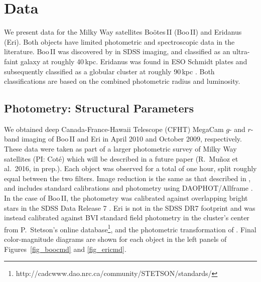 \documentclass{../tex_files/emulateapj}
\begin{document}


\section{Data}\label{sec_data}

We present data for the Milky Way satellites Bo\"otes\,II (Boo\,II)
and Eridanus (Eri).  Both objects have limited photometric and
spectroscopic data in the literature.  Boo\,II was discovered by
\citet{2007ApJ...662L..83W} in SDSS imaging, and classified as an
ultra-faint galaxy at roughly 40\,kpc.  Eridanus was found in ESO
Schmidt plates and subsequently classified as a globular cluster at
roughly 90\,kpc \citep{cesarsky77}.  Both classifications are based on
the combined photometric radius and luminosity.


\subsection{Photometry: Structural Parameters}\label{ssec_struct}

We obtained deep Canada-France-Hawaii Telescope (CFHT) MegaCam $g$-
and $r$-band imaging of Boo\,II and Eri in April 2010 and October
2009, respectively.  These data were taken as part of a larger
photometric survey of Milky Way satellites (PI: Cot\'e) which will be
described in a future paper (R.~Mu\~noz et al.~2016, in prep.).  Each
object was observed for a total of one hour, split roughly equal
between the two filters.  Image reduction is the same as that
described in \citet{munoz10a}, and includes standard calibrations and
photometry using DAOPHOT/Allframe \citep{stetson94a}.  In the case of
Boo\,II, the photometry was calibrated against overlapping bright
stars in the SDSS Data Release 7 \citep[][DR7]{2009ApJS..182..543A}.  Eri is not in
the SDSS DR7 footprint and was instead calibrated against BVI standard
field photometry in the cluster's center from P.~Stetson's online
database\footnote{http://cadcwww.dao.nrc.ca/community/STETSON/standards/},
and the photometric transformation of \citet{2007AJ....133..734B}.  Final
color-magnitude diagrams are shown for each object in the left panels
of Figures~\ref{fig_boocmd} and \ref{fig_ericmd}.
\end{document}
